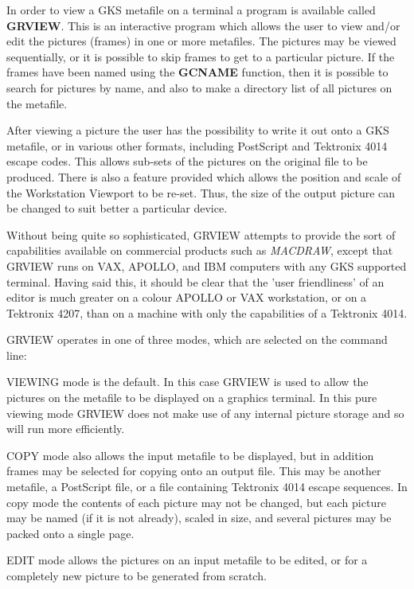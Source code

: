 In order to view a GKS metafile on a terminal a program is available
called {\bf GRVIEW}.
This is an interactive program which allows the user to view and/or edit
the pictures (frames) in one or more metafiles.
The pictures may be viewed sequentially,
or it is possible to skip frames to get to a particular picture.
If the frames have been named using the {\bf GCNAME} function,
then it is possible to search for pictures by name, and also to make
a directory list of all pictures on the metafile.
 
After viewing a picture the user has the possibility to write it out
onto a GKS metafile, or in various other formats, including PostScript
and Tektronix 4014 escape codes.
This allows sub-sets of the pictures on the original file to be produced.
There is also a feature provided which allows the position and scale of the
Workstation Viewport to be re-set. Thus, the size of the output picture can
be changed to suit better a particular device.
 
Without being quite so sophisticated, GRVIEW attempts to provide the sort
of capabilities available on commercial products such as {\it MACDRAW},
except that GRVIEW runs on VAX, APOLLO, and IBM computers with any GKS
supported terminal. Having said this, it should be clear that the
'user friendliness'  of an editor is much greater on a colour APOLLO
or VAX workstation, or on a Tektronix 4207, than on a machine with only
the capabilities of a Tektronix 4014.
 
GRVIEW operates in one of three modes, which are selected on the command line:
\begin{OL}
\item VIEWING mode is the default. In this case GRVIEW is used to allow the
pictures on the metafile to be displayed on a graphics terminal.
In this pure viewing mode GRVIEW does not make use of any internal picture
storage and so will run more efficiently.
\item COPY mode also allows the input metafile to be displayed, but in
addition frames may be selected for copying onto an output file.
This may be another metafile, a PostScript file, or a file containing
Tektronix 4014 escape sequences. In copy mode the contents of each picture
may not be changed, but each picture may be named (if it is not already),
scaled in size, and several pictures may be packed onto a single page.
\item EDIT mode allows the pictures on an input metafile to be edited,
or for a completely new picture to be generated from scratch.
\end{OL}
 
